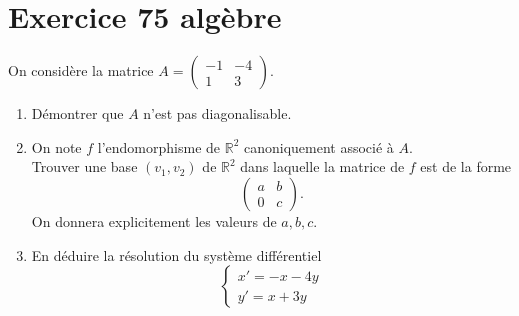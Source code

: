 \documentclass[a4paper,12pt,oneside]{book}
\newenvironment{statement}{\begin{statementbox}}{\end{statementbox}}
\begin{document}
\section*{Exercice 75 \quad algèbre}
\begin{statement}
	On considère la matrice \( A = \begin{pmatrix} -1 & -4 \\ 1 & 3 \end{pmatrix} \).
	\begin{enumerate}
		\item Démontrer que \( A \) n’est pas diagonalisable.
		\item On note \( f \) l’endomorphisme de \( \mathbb{R}^2 \) canoniquement associé à \( A \).\\
		Trouver une base \( (v_1, v_2) \) de \( \mathbb{R}^2 \) dans laquelle la matrice de \( f \) est de la forme
		\[
		\begin{pmatrix}
			a & b \\
			0 & c
		\end{pmatrix}.
		\]
		On donnera explicitement les valeurs de \( a, b, c \).
		\item En déduire la résolution du système différentiel
		\[
		\begin{cases}
			x' = -x - 4y \\
			y' = x + 3y
		\end{cases}
		\]
	\end{enumerate}
\end{statement}
\end{document}

